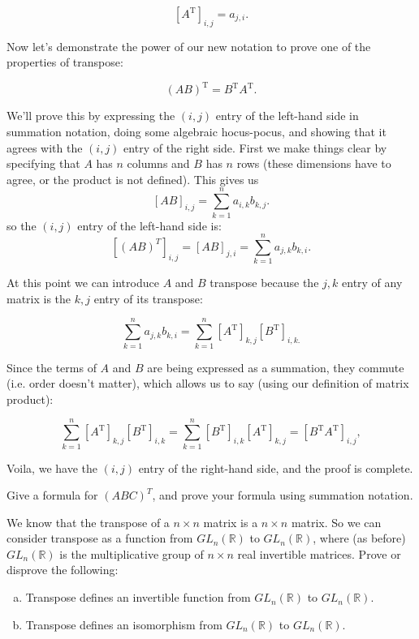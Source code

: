 \[ \left[ {A}^{\text{T}} \right]_{i,j} = {a}_{j,i}. \]

Now let's demonstrate the power of our new notation to prove one of the properties of transpose:

\[ \left( {A}{B} \right)^{\text{T}} = {B}^{\text{T}} {A}^{\text{T}}. \]

We'll prove this by expressing the $(i,j)$ entry of the left-hand side in summation notation,  doing some algebraic hocus-pocus, and showing that it agrees with the $(i,j)$ entry of the right side.  First we make things clear by specifying that ${A}$ has $n$ columns and $B$ has $n$ rows (these dimensions have to agree, or the product is not defined). This gives us
\[ \left[ AB \right]_{i,j}= \sum_{k=1}^n a_{i,k} b_{k,j}. \]
so the $(i,j)$ entry of the left-hand side is:
 \[ \left[ (AB)^T \right]_{i,j} = \left[ AB \right]_{j,i} = \sum_{k=1}^n a_{j,k} b_{k,i}. \]

At this point we can introduce ${A}$ and ${B}$ transpose  because the $j,k$ entry of any matrix is the $k,j$ entry of its transpose:

\[  \sum_{k=1}^n a_{j,k} b_{k,i} =  \sum_{k=1}^n \left[A^{\text{T}}\right]_{k,j} \left[B^{\text{T}}\right]_{i,k.} \]

Since the terms of ${A}$ and ${B}$ are being expressed as a summation, they commute (i.e. order doesn't matter), which allows us to say (using our definition of matrix product):

\[ \sum_{k=1}^n \left[A^{\text{T}}\right]_{k,j} \left[B^{\text{T}}\right]_{i,k} = \sum_{k=1}^n \left[B^{\text{T}}\right]_{i,k}\left[A^{\text{T}}\right]_{k,j} = \left[ {B}^{\text{T}}{A}^{\text{T}} \right]_{i,j}, \]

Voila, we have the $(i,j)$ entry of the right-hand side, and the proof is complete.



\begin{exercise}{}
Give a formula for $(ABC)^T$, and prove your formula using summation notation.
\end{exercise}

\begin{exercise}{}
We know that the transpose of a $n \times n$ matrix is a $n \times n$ matrix.  So we can consider transpose as a function from $GL_n(\mathbb{R})$ to $GL_n(\mathbb{R})$, where (as before)  $GL_n(\mathbb{R})$  is the multiplicative group of $n \times n$ real invertible matrices. Prove or disprove the following:
\begin{enumerate}[(a)]
\item
Transpose defines an invertible function from $GL_n(\mathbb{R})$ to $GL_n(\mathbb{R})$.
\item
Transpose defines an isomorphism from $GL_n(\mathbb{R})$ to $GL_n(\mathbb{R})$.
\end{enumerate}
\end{exercise}

